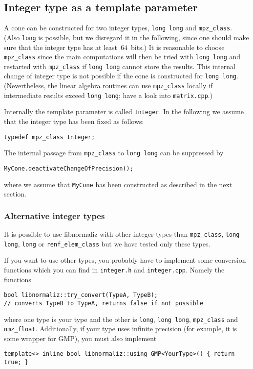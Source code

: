 \documentclass[12pt,a4paper]{scrartcl}
\theoremstyle{definition}
\begin{document}
\begin{small}
\subsection{Integer type as a template parameter}

A cone can be constructed for two integer types, \verb|long long| and \verb|mpz_class|. (Also \verb|long| is possible, but we disregard it in the following, since one should make sure that the integer type has at least~$64$~bits.) It is reasonable to choose \verb|mpz_class| since the main computations will then be tried with \verb|long long| and restarted with \verb|mpz_class| if \verb|long long| cannot store the results. This internal change of integer type is not possible if the cone is constructed for \verb|long long|. (Nevertheless, the linear algebra routines can use \verb|mpz_class| locally if intermediate results exceed \verb|long long|; have a look into \verb|matrix.cpp|.)

Internally the template parameter is called \verb|Integer|. In the following we assume that the integer type has been fixed as follows:
\begin{Verbatim}
typedef mpz_class Integer;
\end{Verbatim}

The internal passage from \verb|mpz_class| to \verb|long long| can be suppressed by
\begin{Verbatim}
MyCone.deactivateChangeOfPrecision();
\end{Verbatim}
where we assume that \verb|MyCone| has been constructed as described in the next section.

\subsubsection{Alternative integer types}

It is possible to use libnormaliz with other integer types than \verb|mpz_class|, \verb|long long|, \verb|long| or \verb|renf_elem_class| but we have tested only these types.

If you want to use other types, you probably have to implement some conversion functions which you can find in \verb|integer.h| and \verb|integer.cpp|. Namely the functions
\begin{Verbatim}
bool libnormaliz::try_convert(TypeA, TypeB); 
// converts TypeB to TypeA, returns false if not possible
\end{Verbatim}
where one type is your type and the other is \verb|long|, \verb|long long|, \verb|mpz_class| and \verb|nmz_float|.
Additionally, if your type uses infinite precision (for example, it is some wrapper for GMP), you must also implement
\begin{Verbatim}
template<> inline bool libnormaliz::using_GMP<YourType>() { return true; }
\end{Verbatim}


\end{small}
\end{document}
